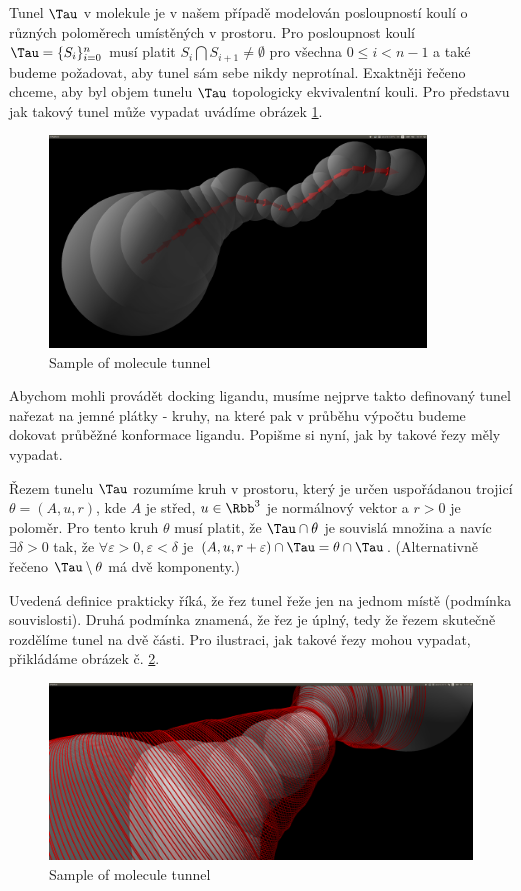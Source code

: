 Tunel $ \Tau $ v molekule je v našem případě modelován posloupností koulí o různých
poloměrech umístěných v prostoru. Pro posloupnost koulí $ \Tau = \{S_i\}_{i=0}^{n} $
musí platit $ S_i \bigcap S_{i+1} \neq \emptyset $ pro všechna $ 0 \leq i < n - 1$ a
také budeme požadovat, aby tunel sám sebe nikdy neprotínal. Exaktněji řečeno
chceme, aby byl objem tunelu $ \Tau $ topologicky ekvivalentní kouli.
Pro představu jak takový tunel může vypadat uvádíme obrázek \ref{fig:basic_tunnel}.
\begin{figure}[ht]
  	\centering
	\includegraphics[width=100mm]{img/basic_tunnel.jpg}
	\caption{Sample of molecule tunnel}
  \centering
  \label{fig:basic_tunnel}
\end{figure}


Abychom mohli provádět docking ligandu, musíme nejprve takto definovaný tunel nařezat na
jemné plátky - kruhy, na které pak v průběhu výpočtu budeme dokovat průběžné konformace ligandu.
Popišme si nyní, jak by takové řezy měly vypadat.

\begin{defi}
Řezem tunelu $ \Tau $ rozumíme kruh v prostoru, který je určen uspořádanou trojicí
$\theta = (A, u, r)$, kde $ A $ je střed, $ u \in \Rbb^3 $ je normálnový vektor a $ r > 0 $ je poloměr.
Pro tento kruh $ \theta $ musí platit, že $ \Tau \cap \theta $ je souvislá množina a navíc
$ \exists \delta > 0 $ tak, že $ \forall \varepsilon > 0,  \varepsilon < \delta $ je
$ (A, u, r + \varepsilon) \cap \Tau = \theta \cap \Tau $.
(Alternativně řečeno $\Tau \setminus \theta $ má dvě komponenty.)
\end{defi}

Uvedená definice prakticky říká, že řez tunel řeže jen na jednom místě (podmínka souvislosti).
Druhá podmínka znamená, že řez je úplný, tedy že řezem skutečně rozdělíme tunel na dvě části.
Pro ilustraci, jak takové řezy mohou vypadat, přikládáme obrázek č. \ref{fig:tunnel_cuts}.
\begin{figure}[ht]
    \centering
    \includegraphics[width=\textwidth]{img/simple_cuts.png}
    \caption{Sample of molecule tunnel}
  \centering
  \label{fig:tunnel_cuts}
\end{figure}

